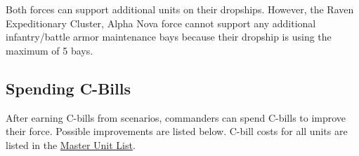\documentclass[UTF8]{article}
\begin{document}
Both forces can support additional units on their dropships.
However, the Raven Expeditionary Cluster, Alpha Nova force cannot support any additional infantry/battle armor maintenance bays because their dropship is using the maximum of 5 bays.\\

\newpage

\subsection{Spending C-Bills}

After earning C-bills from scenarios, commanders can spend C-bills to improve their force.
Possible improvements are listed below.
C-bill costs for all units are listed in the \href{http://www.masterunitlist.info/}{Master Unit List}.\\
\end{document}
